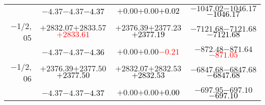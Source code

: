 \documentclass[compress]{beamer}
\begin{document}
\begin{frame}
{\begin{tabular}{r | c | c | c}
           & $-4.37$\hspace{0.1 cm}$-4.37$\hspace{0.1 cm}\textcolor{black}{$-4.37$} & $+0.00$\hspace{0.1 cm}$+0.00$\hspace{0.1 cm}\textcolor{black}{$+0.02$} & $-1047.02$\hspace{0.1 cm}$-1046.17$\hspace{0.1 cm}\textcolor{black}{$-1046.17$} \\
$-$1/2, 05 & $+2832.07$\hspace{0.1 cm}$+2833.57$\hspace{0.1 cm}\textcolor{red}{$+2833.61$} & $+2376.39$\hspace{0.1 cm}$+2377.23$\hspace{0.1 cm}\textcolor{black}{$+2377.19$} & $-7121.68$\hspace{0.1 cm}$-7121.68$\hspace{0.1 cm}\textcolor{black}{$-7121.68$} \\
           & $-4.37$\hspace{0.1 cm}$-4.37$\hspace{0.1 cm}\textcolor{black}{$-4.36$} & $+0.00$\hspace{0.1 cm}$+0.00$\hspace{0.1 cm}\textcolor{red}{$-0.21$} & $-872.48$\hspace{0.1 cm}$-871.64$\hspace{0.1 cm}\textcolor{red}{$-871.05$} \\
$-$1/2, 06 & $+2376.39$\hspace{0.1 cm}$+2377.50$\hspace{0.1 cm}\textcolor{black}{$+2377.50$} & $+2832.07$\hspace{0.1 cm}$+2832.53$\hspace{0.1 cm}\textcolor{black}{$+2832.53$} & $-6847.68$\hspace{0.1 cm}$-6847.68$\hspace{0.1 cm}\textcolor{black}{$-6847.68$} \\
           & $-4.37$\hspace{0.1 cm}$-4.37$\hspace{0.1 cm}\textcolor{black}{$-4.37$} & $+0.00$\hspace{0.1 cm}$+0.00$\hspace{0.1 cm}\textcolor{black}{$+0.00$} & $-697.95$\hspace{0.1 cm}$-697.10$\hspace{0.1 cm}\textcolor{black}{$-697.10$} \\
\end{tabular}}
\end{frame}
\end{document}
